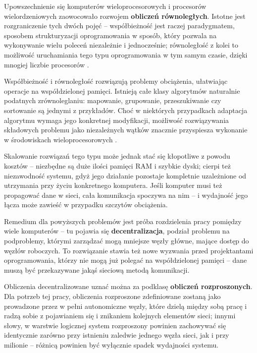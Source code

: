 Upowszechnienie się komputerów wieloprocesorowych i procesorów wielordzeniowych zaowocowało rozwojem \textbf{obliczeń równoległych}. Istotne jest rozgraniczenie tych dwóch pojęć -- współbieżność jest raczej paradygmatem, sposobem strukturyzacji oprogramowania w sposób, który pozwala na wykonywanie wielu poleceń niezależnie i jednocześnie; równoległość z kolei to możliwość uruchamiania tego typu oprogramowania w tym samym czasie, dzięki mnogiej liczbie procesorów \cite{concurrencyGo}.

Współbieżność i równoległość rozwiązują problemy obciążenia, ułatwiając operacje na współdzielonej pamięci. Istnieją całe klasy algorytmów naturalnie podatnych zrównoleglaniu: mapowanie, grupowanie, przeszukiwanie czy sortowanie są jednymi z przykładów. Choć w niektórych przypadkach adaptacja algorytmu wymaga jego konkretnej modyfikacji, możliwość rozwiązywania składowych problemu jako niezależnych wątków znacznie przyspiesza wykonanie w środowiskach wieloprocesorowych \cite{parallelAlgo}.


Skalowanie rozwiązań tego typu może jednak stać się kłopotliwe z powodu kosztów -- niezbędne są duże ilości pamięci RAM i szybkie dyski; cierpi też niezawodność systemu, gdyż jego działanie pozostaje kompletnie uzależnione od utrzymania przy życiu konkretnego komputera. Jeśli komputer musi też propagować dane w sieci, cała komunikacja spoczywa na nim -- i wydajność jego łącza może zawieść w przypadku szczytów obciążenia.

Remedium dla powyższych problemów jest próba rozdzielenia pracy pomiędzy wiele komputerów -- tu pojawia się \textbf{decentralizacja}, podział problemu na podproblemy, którymi zarządzać mogą mniejsze węzły główne, mające dostęp do węzłów roboczych. To rozwiązanie stawia też nowe wyzwania przed projektantami oprogramowania, którzy nie mogą już polegać na współdzielonej pamięci -- dane muszą być przekazywane jakąś sieciową metodą komunikacji.

Obliczenia decentralizowane uznać można za podklasę \textbf{obliczeń rozproszonych}. Dla potrzeb tej pracy, obliczenia rozproszone zdefiniowane zostaną jako prowadzone przez w pełni autonomiczne węzły, które dzielą między sobą pracę i radzą sobie z pojawianiem się i znikaniem kolejnych elementów sieci; innymi słowy, w warstwie logicznej system rozproszony powinien zachowywać się identycznie zarówno przy istnieniu zaledwie jednego węzła sieci, jak i przy milionie -- różnicą powinien być wyłącznie spadek wydajności systemu.



